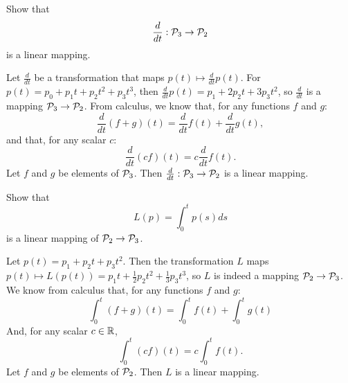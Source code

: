 \documentclass{ximera}
\begin{document}
\begin{exercise}  \label{c7.2.2a}
Show that
\[
\frac{d}{dt}:{\cal P}_3\to{\cal P}_2
\]
is a linear mapping.

\begin{solution}

Let $\frac{d}{dt}$ be a transformation that maps $p(t) \mapsto
\frac{d}{dt}p(t)$.  For $p(t) =  p_0 + p_1t + p_2t^2 + p_3t^3$, then
$\frac{d}{dt}p(t) = p_1 + 2p_2t + 3p_3t^2$, so $\frac{d}{dt}$ is 
a mapping ${\cal P}_3 \rightarrow {\cal P}_2$.  From calculus, we
know that, for any functions $f$ and $g$:
\[ 
\frac{d}{dt}(f + g)(t) = \frac{d}{dt}f(t) + \frac{d}{dt}g(t), 
\]
and that, for any scalar $c$:
\[ 
\frac{d}{dt}(cf)(t) = c\frac{d}{dt}f(t). 
\]
Let $f$ and $g$ be elements of ${\cal P}_3$.  Then
$\frac{d}{dt}: {\cal P}_3 \rightarrow {\cal P}_2$ is a linear mapping.

\end{solution}
\end{exercise}
\begin{exercise}  \label{c7.2.2b}
Show that
\[
L(p) = \int_0^tp(s)ds
\]
is a linear mapping of ${\cal P}_2\to{\cal P}_3$.

\begin{solution}

Let $p(t) = p_1 + p_2t + p_3t^2$.  Then the transformation $L$
maps $p(t) \mapsto L(p(t)) = p_1t + \frac{1}{2}p_2t^2 +
\frac{1}{3}p_3t^3$, so $L$ is indeed a mapping ${\cal P}_2
\rightarrow {\cal P}_3$.  We know from calculus that, for any
functions $f$ and $g$:
\[ \int_0^t(f + g)(t) = \int_0^tf(t) + \int_0^tg(t) \]
And, for any scalar $c \in \mbox{$\Bbb{R}$}$,
\[ \int_0^t(cf)(t) = c\int_0^tf(t). \]
Let $f$ and $g$ be elements of ${\cal P}_2$.  Then $L$ is a linear
mapping.

\end{solution}
\end{exercise}
\end{document}
